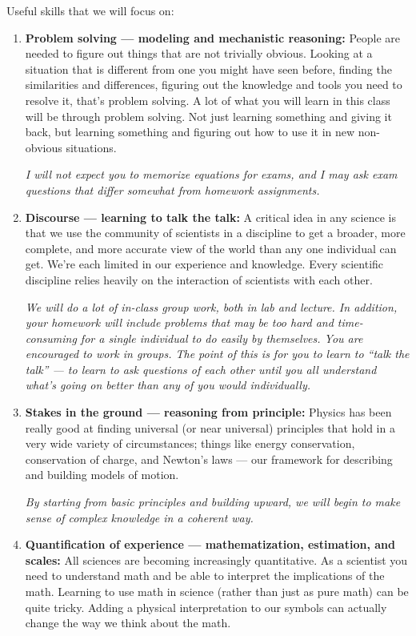 Useful skills that we will focus on:
\begin{enumerate}
  \item {\bf Problem solving --- modeling and mechanistic reasoning:} 
    People are needed to figure out things that are not trivially obvious. Looking at a situation that is different from one you might have seen before, finding the similarities and differences, figuring out the knowledge and tools you need to resolve it, that's problem solving. A lot of what you will learn in this class will be through problem solving. Not just learning something and giving it back, but learning something and figuring out how to use it in new non-obvious situations.

    {\it I will not expect you to memorize equations for exams, and I may ask exam questions that differ somewhat from homework assignments.}

    \item {\bf Discourse --- learning to talk the talk:} 
      A critical idea in any science is that we use the community of scientists in a discipline to get a broader, more complete, and more accurate view of the world than any one individual can get. We're each limited in our experience and knowledge. Every scientific discipline relies heavily on the interaction of scientists with each other.

      {\it We will do a lot of in-class group work, both in lab and lecture. In addition, your homework will include problems that may be too hard and time-consuming for a single individual to do easily by themselves. You are encouraged to work in groups. The point of this is for you to learn to ``talk the talk'' --- to learn to ask questions of each other until you all understand what's going on better than any of you would individually.}
      
\item {\bf Stakes in the ground --- reasoning from principle:}
  Physics has been really good at finding universal (or near universal) principles that hold in a very wide variety of circumstances; things like energy conservation, conservation of charge, and Newton's laws --- our framework for describing and building models of motion.

  {\it By starting from basic principles and building upward, we will begin to make sense of complex knowledge in a coherent way.}

\item {\bf Quantification of experience --- mathematization, estimation, and scales:}
  All sciences are becoming increasingly quantitative. As a scientist you need to understand math and be able to interpret the implications of the math. Learning to use math in science (rather than just as pure math) can be quite tricky. Adding a physical interpretation to our symbols can actually change the way we think about the math.


\end{enumerate}
